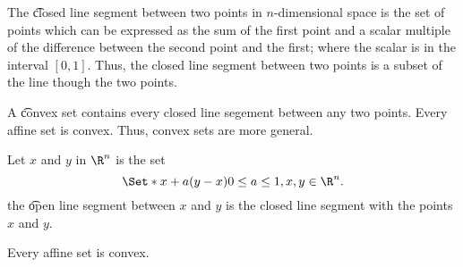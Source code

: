 



The \t{closed line segment between} two points in $n$-dimensional space is the set of points which can be expressed as the sum of the first point and a scalar multiple of the difference between the second point and the first; where the scalar is in the interval $[0, 1]$.
Thus, the closed line segment between two points is a subset of the line though the two points.

A \t{convex set} contains every closed line segement between any two points.
Every affine set is convex.
Thus, convex sets are more general.

Let $x$ and $y$ in $\R^n$ is the set
$$
  \Set*{x + a(y - x)}{0 \leq a \leq 1, x, y \in \R^n}.
$$
the \t{open line segment} between $x$ and $y$ is the closed line segment with the points $x$ and $y$.


\begin{prop}
  Every affine set is convex.
\end{prop}

%
%
%
%
%
%
%
%
%
%
%
%
